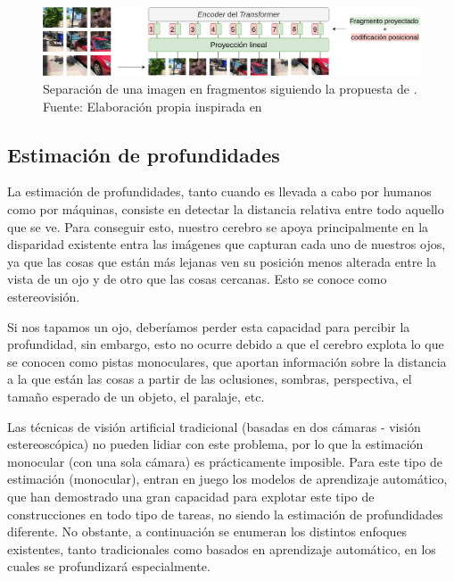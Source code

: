\begin{figure}[H]
\centering
\includegraphics[width=1\linewidth]{imagenes/vision-transformer.png} 
\captionsetup{width=.8\linewidth}
\caption{Separación de una imagen en fragmentos siguiendo la propuesta de \cite{image16x16words}. Fuente: Elaboración propia inspirada en \cite{image16x16words}}
\label{fig:vision-transformer}
\end{figure}


\subsection{Estimación de profundidades}
La estimación de profundidades, tanto cuando es llevada a cabo por humanos como por máquinas, consiste en detectar la distancia relativa entre todo aquello que se ve. Para conseguir esto, nuestro cerebro se apoya principalmente en la disparidad existente entra las imágenes que capturan cada uno de nuestros ojos, ya que las cosas que están más lejanas ven su posición menos alterada entre la vista de un ojo y de otro que las cosas cercanas. Esto se conoce como estereovisión.

Si nos tapamos un ojo, deberíamos perder esta capacidad para percibir la profundidad, sin embargo, esto no ocurre debido a que el cerebro explota lo que se conocen como pistas monoculares, que aportan información sobre la distancia a la que están las cosas a partir de las oclusiones, sombras, perspectiva, el tamaño esperado de un objeto, el paralaje, etc.

Las técnicas de visión artificial tradicional (basadas en dos cámaras - visión estereoscópica) no pueden lidiar con este problema, por lo que la estimación monocular (con una sola cámara) es prácticamente imposible. Para este tipo de estimación (monocular), entran en juego los modelos de aprendizaje automático, que han demostrado una gran capacidad para explotar este tipo de construcciones en todo tipo de tareas, no siendo la estimación de profundidades diferente. No obstante, a continuación se enumeran los distintos enfoques existentes, tanto tradicionales como basados en aprendizaje automático, en los cuales se profundizará especialmente.

